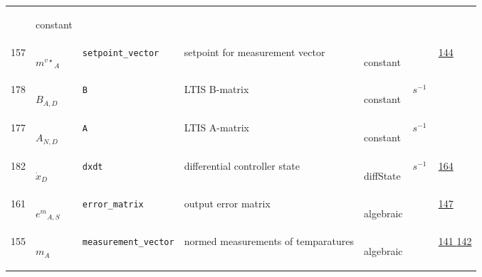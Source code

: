 \begin{longtable}{|p{1cm}|p{2.5cm}|p{4.5cm}|p{8cm}|p{3.0cm}|p{3cm}|p{1cm}|}
             & \begin{lay}constant \end{lay}
             & $  $
             & \\
            157
             & \hypertarget{"v:157"}{ $ {{m^{v\star}}}{_{A}} $}
             & \verb|setpoint_vector|
             & setpoint for measurement vector
             & \begin{lay}constant \end{lay}
             & $  $
             &                 \hyperlink{"e:144"}{ 144 }
                 \\
            178
             & \hypertarget{"v:178"}{ $ {B}{_{A, D}} $}
             & \verb|B|
             & LTIS B-matrix
             & \begin{lay}constant \end{lay}
             & $ s^{-1} \, $
             & \\
            177
             & \hypertarget{"v:177"}{ $ {A}{_{N, D}} $}
             & \verb|A|
             & LTIS A-matrix 
             & \begin{lay}constant \end{lay}
             & $ s^{-1} \, $
             & \\
            182
             & \hypertarget{"v:182"}{ $ {{\dot{x}}}{_{D}} $}
             & \verb|dxdt|
             & differential controller state
             & \begin{lay}diffState \end{lay}
             & $ s^{-1} \, $
             &                 \hyperlink{"e:164"}{ 164 }
                 \\
            161
             & \hypertarget{"v:161"}{ $ {{e^{m}}}{_{A, S}} $}
             & \verb|error_matrix|
             & output error matrix
             & \begin{lay}algebraic \end{lay}
             & $  $
             &                 \hyperlink{"e:147"}{ 147 }
                 \\
            155
             & \hypertarget{"v:155"}{ $ {m}{_{A}} $}
             & \verb|measurement_vector|
             & normed measurements of temparatures
             & \begin{lay}algebraic \end{lay}
             & $  $
             &                 \hyperlink{"e:141"}{ 141 }
                                 \hyperlink{"e:142"}{ 142 }
                 \\

\end{longtable}
